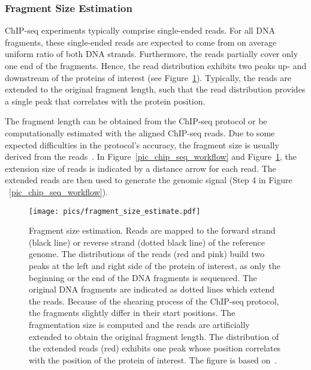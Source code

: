 \subsubsection{Fragment Size Estimation}
\label{sec_challenges_shift}
ChIP-seq experiments typically comprise single-ended reads.
For all DNA fragments, these single-ended reads are expected to come from on average uniform ratio of both DNA strands.
Furthermore, the reads partially cover only one end of the fragments.
Hence, the read distribution exhibits two peaks up- and downstream of the proteins of interest (see Figure~\ref{pic_fragment_size_estimate}).
Typically, the reads are extended to the original fragment length, such that the read distribution provides a single peak that correlates with the protein position.

The fragment length can be obtained from the ChIP-seq protocol or be computationally estimated with the aligned ChIP-seq reads.
Due to some expected difficulties in the protocol's accuracy, the fragment size is usually derived from the reads~\citep{Pepke2009}.
In Figure~\ref{pic_chip_seq_workflow} and Figure~\ref{pic_fragment_size_estimate}, the extension size of reads is indicated by a distance arrow for each read.
The extended reads are then used to generate the genomic signal (Step 4 in Figure ~\ref{pic_chip_seq_workflow}).

\begin{figure}[ht]
  \centering
  \texttt{[image: pics/fragment\_size\_estimate.pdf]}
\caption[Fragment size estimation]{Fragment size estimation. 
Reads are mapped to the forward strand (black line) or reverse strand (dotted black line) of the reference genome.
The distributions of the reads (red and pink) build two peaks at the left and right side of the protein of interest, as only the beginning or the end of the DNA fragments is sequenced.
The original DNA fragments are indicated as dotted lines which extend the reads.
Because of the shearing process of the ChIP-seq protocol, the fragments slightly differ in their start positions.
The fragmentation size is computed and the reads are artificially extended to obtain the original fragment length.
The distribution of the extended reads (red) exhibits one peak whose position correlates with the position of the protein of interest.
The figure is based on~\cite{park2009}.
}
\label{pic_fragment_size_estimate}
\end{figure}




